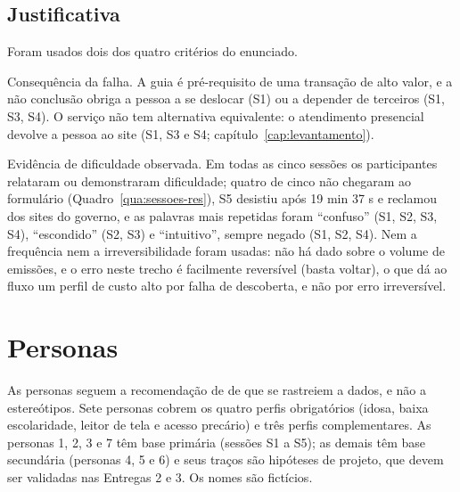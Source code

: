 \documentclass[
  12pt,
  oneside,
  a4paper,
  chapter=TITLE,
  section=TITLE,
  english,
  brazilian
]{abntex2}
\begin{document}
\section{Justificativa}

Foram usados dois dos quatro critérios do enunciado.

Consequência da falha. A guia é pré-requisito de uma transação de alto
valor, e a não conclusão obriga a pessoa a se deslocar (S1) ou a depender de
terceiros (S1, S3, S4). O serviço não tem alternativa equivalente: o atendimento
presencial devolve a pessoa ao site (S1, S3 e S4; capítulo~\ref{cap:levantamento}).

Evidência de dificuldade observada. Em todas as cinco sessões os participantes relataram ou demonstraram dificuldade; quatro de cinco não chegaram ao formulário (Quadro~\ref{qua:sessoes-res}), S5 desistiu após 19 min 37 s e reclamou dos sites do governo, e as palavras mais repetidas foram ``confuso'' (S1, S2, S3, S4), ``escondido'' (S2, S3) e ``intuitivo'', sempre negado (S1, S2, S4). Nem a frequência nem a
irreversibilidade foram usadas: não há dado sobre o volume de emissões, e o erro
neste trecho é facilmente reversível (basta voltar), o que dá ao fluxo um perfil
de custo alto por falha de descoberta, e não por erro irreversível.

\chapter{Personas}\label{cap:personas}

As personas seguem a recomendação de  de que se rastreiem
a dados, e não a estereótipos. Sete personas cobrem os quatro perfis obrigatórios (idosa, baixa escolaridade, leitor de tela e acesso precário) e três perfis complementares. As personas 1, 2, 3 e 7 têm base primária (sessões S1 a S5); as demais têm base secundária (personas 4, 5 e 6) e seus traços são hipóteses de projeto, que devem
ser validadas nas Entregas 2 e 3. Os nomes são fictícios.
\end{document}
